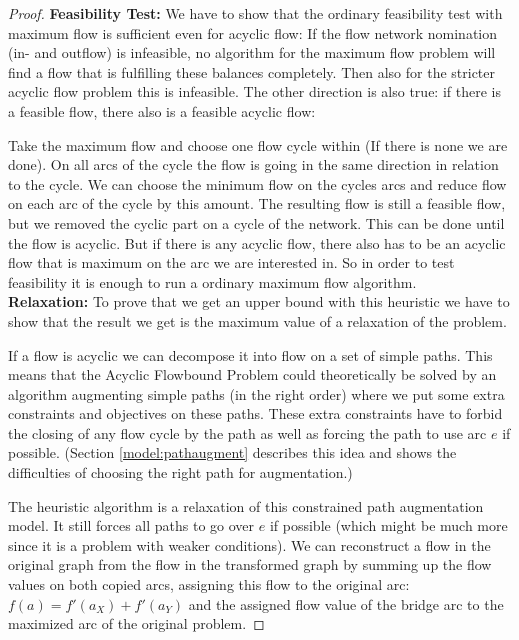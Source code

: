 \begin{proof}
\textbf{Feasibility Test: }We have to show that the ordinary feasibility test with maximum flow is sufficient even for 
acyclic flow: If the flow network nomination (in- and outflow) is infeasible, no algorithm for the 
maximum flow problem will find a flow that is fulfilling these balances completely. Then also for the stricter acyclic 
flow problem this is infeasible. The other direction is also true: if there is a feasible flow, there also is a 
feasible acyclic flow:

Take the maximum flow and choose one flow cycle within (If there is none we are done). On all arcs of the cycle the 
flow is going in the same direction in relation to the cycle. We can choose the minimum flow on the cycles arcs and 
reduce flow on each arc of the cycle by this amount. The resulting flow is still a feasible flow, but we removed the 
cyclic part on a cycle of the network. This can be done until the flow is acyclic. But if there is any acyclic flow,
there also has to be an 
acyclic flow that is maximum on the arc we are interested in. So in order to test feasibility it is enough to run a 
ordinary maximum flow algorithm.\\


\textbf{Relaxation: }To prove that we get an upper bound with this heuristic we have to show that the result we 
get is the maximum value of a relaxation of the problem. 

If a flow is acyclic we can decompose it into flow on a set of simple paths. This means that 
the Acyclic Flowbound Problem could theoretically be solved by an algorithm augmenting simple paths (in the 
right order) where we put some extra constraints and objectives on these paths. These extra constraints have to forbid 
the closing of any flow cycle by the path as well as forcing the path to use arc $e$ if possible. (Section 
\ref{model:pathaugment} describes this idea and shows the difficulties of choosing the right path for augmentation.)

The heuristic algorithm is a relaxation of this constrained path augmentation model. It still forces all paths to go 
over $e$ if possible (which might be much more since it is a problem with weaker conditions). 
We can reconstruct a flow in the original graph from the flow in the transformed graph by summing up the flow values on 
both copied arcs, assigning this flow to the original arc: $f(a)=f'(a_X)+f'(a_Y)$ and the assigned flow value of the 
bridge arc to the maximized arc of the original problem. 


\end{proof}
